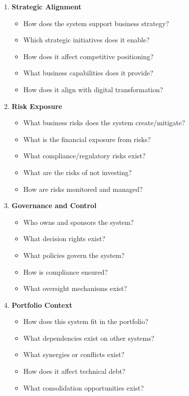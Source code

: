 \documentclass[11pt,letterpaper]{article}
\begin{document}
\begin{enumerate}[label=\textbf{C\arabic*:}, leftmargin=2.5em]
    \item \textbf{Strategic Alignment}
    \begin{itemize}[nosep]
        \item How does the system support business strategy?
        \item Which strategic initiatives does it enable?
        \item How does it affect competitive positioning?
        \item What business capabilities does it provide?
        \item How does it align with digital transformation?
    \end{itemize}
    
    \item \textbf{Risk Exposure}
    \begin{itemize}[nosep]
        \item What business risks does the system create/mitigate?
        \item What is the financial exposure from risks?
        \item What compliance/regulatory risks exist?
        \item What are the risks of not investing?
        \item How are risks monitored and managed?
    \end{itemize}
    
    \item \textbf{Governance and Control}
    \begin{itemize}[nosep]
        \item Who owns and sponsors the system?
        \item What decision rights exist?
        \item What policies govern the system?
        \item How is compliance ensured?
        \item What oversight mechanisms exist?
    \end{itemize}
    
    \item \textbf{Portfolio Context}
    \begin{itemize}[nosep]
        \item How does this system fit in the portfolio?
        \item What dependencies exist on other systems?
        \item What synergies or conflicts exist?
        \item How does it affect technical debt?
        \item What consolidation opportunities exist?
    \end{itemize}
    

\end{enumerate}
\end{document}
